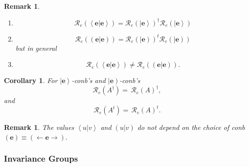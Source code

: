 \documentclass[aps,preprint]{revtex4}%
\newtheorem{corollary}[theorem]{Corollary}
\newtheorem{remark}[theorem]{Remark}
\begin{document}
\begin{remark}
\begin{enumerate}
\begin{enumerate}
\item
\begin{equation}
\mathcal{R}_{e}\left(  \left\langle \left.  \mathbf{e}\right\vert
\mathbf{e}\right\rangle \right)  =\mathcal{R}_{e}\left(  \left\vert
\mathbf{e}\right\rangle \right)  ^{\dagger}\mathcal{R}_{e}\left(  \left\vert
\mathbf{e}\right\rangle \right)
\end{equation}


\item
\begin{equation}
\mathcal{R}_{e}\left(  \left(  \left.  \mathbf{e}\right\vert \mathbf{e}%
\right)  \right)  =\mathcal{R}_{e}\left(  \left\vert \mathbf{e}\right)
\right)  ^{t}\mathcal{R}_{e}\left(  \left\vert \mathbf{e}\right)  \right)
\end{equation}
but in general

\item
\begin{equation}
\mathcal{R}_{e}\left(  \left\langle \left.  \mathbf{e}\right\vert
\mathbf{e}\right\rangle \right)  \neq\mathcal{R}_{e}\left(  \left(  \left.
\mathbf{e}\right\vert \mathbf{e}\right)  \right)  .
\end{equation}

\end{enumerate}
\end{enumerate}
\end{remark}

\begin{corollary}
For $\left\vert \mathbf{e}\right\rangle $-conb's and $\left\vert
\mathbf{e}\right)  $-conb's
\begin{equation}
\mathcal{R}_{e}\left(  A^{\dagger}\right)  =\,\mathcal{R}_{e}\left(  A\right)
^{\dagger},
\end{equation}
and
\begin{equation}
\mathcal{R}_{e}\left(  A^{t}\right)  =\,\mathcal{R}_{e}\left(  A\right)  ^{t}.
\end{equation}

\end{corollary}

\begin{remark}
The values $\left\langle \left.  u\right\vert v\right\rangle $ and $\left(
\left.  u\right\vert v\right)  $ do not depend on the choice of conb $\left(
\mathbf{e}\right)  \equiv\left(  \longleftarrow\mathbf{e\rightarrow}\right)
.$
\end{remark}

\subsubsection{Invariance Groups \label{Invariance Groups}}
\end{document}
